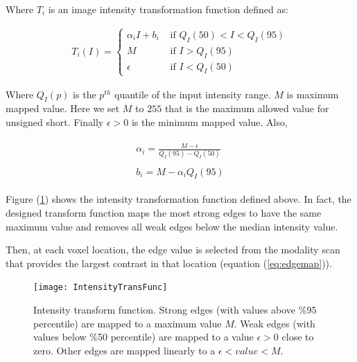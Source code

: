 Where $T_{i}$ is an image intensity transformation function defined as:

\begin{equation}
\label{eq:intensityTransformFunc}
\begin{gathered}
T_{i}(I) = \begin{cases}
\alpha_{i} I + b_{i} & \text{ if   } Q_I(50) < I < Q_I(95) \\ 
M & \text{ if } I > Q_I(95) \\ 
\epsilon  & \text{ if } I < Q_I(50) 
\end{cases}
\end{gathered}
\end{equation}

Where $Q_I(p)$ is the $p^{th}$ quantile of the input intensity range. 
$M$ is maximum mapped value. Here we set $M$ to $255$ that is the maximum allowed value for unsigned short.
Finally $\epsilon > 0$ is the minimum mapped value. Also,

\begin{equation}
\label{eq:alpha_b}
\begin{gathered}
\begin{matrix}
\alpha_{i} = \frac{M-\epsilon }{Q_{I}(95)-Q_{I}(50)}\\
\\
b_{i} = M - \alpha_{i} Q_{I}(95)
\end{matrix}
\end{gathered}
\end{equation}

Figure (\ref{IntensityTransFunc}) shows the intensity transformation function defined above.
In fact, the designed transform function maps the most strong edges to have the same maximum value and removes all weak edges below the median intensity value.

Then, at each voxel location, the edge value is selected from the modality scan that provides the largest contrast in that location (equation (\ref{eq:edgemap})).

\begin{figure}
\centering
\texttt{[image: IntensityTransFunc]}\
\centering
\caption{Intensity transform function. Strong edges (with values above \%95 percentile) are mapped to a maximum value $M$. Weak edges (with values below \%50 percentile) are mapped to a value $\epsilon > 0$ close to zero. Other edges are mapped linearly to a $\epsilon < value < M$.}
\label{IntensityTransFunc}
\end{figure}

